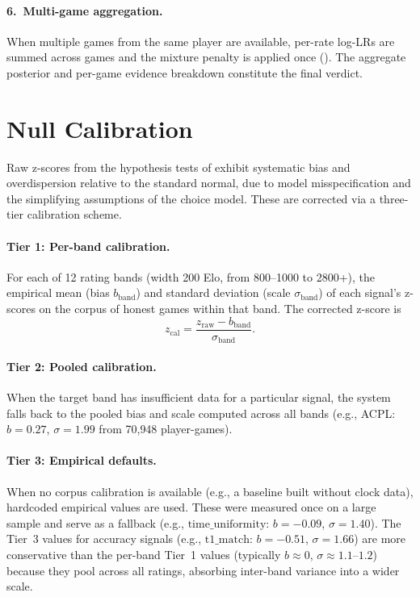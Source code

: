 \documentclass[11pt,a4paper]{article}
\theoremstyle{definition}
\begin{document}
\paragraph{6.\ Multi-game aggregation.}
When multiple games from the same player are available, per-rate log-LRs
are summed across games and the mixture penalty is applied once
().  The aggregate posterior and per-game
evidence breakdown constitute the final verdict.


\section{Null Calibration}
\label{sec:calibration}

Raw z-scores from the hypothesis tests of  exhibit
systematic bias and overdispersion relative to the standard normal, due
to model misspecification and the simplifying assumptions of the choice
model.  These are corrected via a three-tier calibration scheme.

\paragraph{Tier 1: Per-band calibration.}
For each of 12 rating bands (width 200 Elo, from 800--1000 to
2800+), the empirical mean (bias $b_{\mathrm{band}}$) and
standard deviation (scale $\sigma_{\mathrm{band}}$) of each signal's
z-scores on the corpus of honest games within that band.  The corrected
z-score is
\begin{equation}
  \label{eq:calib}
  z_{\mathrm{cal}} = \frac{z_{\mathrm{raw}} - b_{\mathrm{band}}}
    {\sigma_{\mathrm{band}}}.
\end{equation}

\paragraph{Tier 2: Pooled calibration.}
When the target band has insufficient data for a particular signal, the
system falls back to the pooled bias and scale computed across all bands
(e.g., ACPL: $b = 0.27$, $\sigma = 1.99$ from 70{,}948 player-games).

\paragraph{Tier 3: Empirical defaults.}
When no corpus calibration is available (e.g., a baseline built without
clock data), hardcoded empirical values are used.  These were measured
once on a large sample and serve as a fallback
(e.g., $\mathrm{time\_uniformity}$: $b = -0.09$, $\sigma = 1.40$).
The Tier~3 values for accuracy signals (e.g., $\mathrm{t1\_match}$:
$b = -0.51$, $\sigma = 1.66$) are more conservative than the
per-band Tier~1 values (typically $b \approx 0$,
$\sigma \approx 1.1$--$1.2$) because they pool across all ratings,
absorbing inter-band variance into a wider scale.
\end{document}
